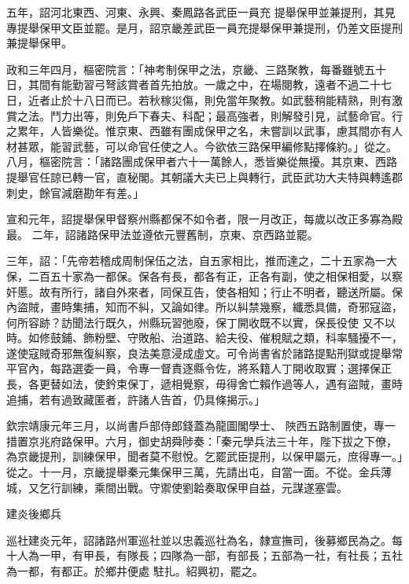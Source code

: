 \begin{pinyinscope}
 五年，詔河北東西、河東、永興、秦鳳路各武臣一員充
 提舉保甲並兼提刑，其見專提舉保甲文臣並罷。是月，詔京畿差武臣一員充提舉保甲兼提刑，仍差文臣提刑兼提舉保甲。



 政和三年四月，樞密院言：「神考制保甲之法，京畿、三路聚教，每番雖號五十日，其間有能勤習弓弩該賞者首先拍放。一歲之中，在場閱教，遠者不過二十七日，近者止於十八日而已。若秋稼災傷，則免當年聚教。如武藝稍能精熟，則有激賞之法。鬥力出等，則免戶下春夫、科配；最高強者，則解發引見，試藝命官。行
 之累年，人皆樂從。惟京東、西雖有團成保甲之名，未嘗訓以武事，慮其間亦有人材甚眾，能習武藝，可以命官任使之人。今欲依三路保甲編修點擇條約。」從之。八月，樞密院言：「諸路團成保甲者六十一萬餘人，悉皆樂從無擾。其京東、西路提舉官任諒已轉一官，直秘閣。其朝議大夫已上與轉行，武臣武功大夫特與轉遙郡刺史，餘官減磨勘年有差。」



 宣和元年，詔提舉保甲督察州縣都保不如令者，限一月改正，每歲以改正多寡為殿最。
 二年，詔諸路保甲法並遵依元豐舊制，京東、京西路並罷。



 三年，詔：「先帝若稽成周制保伍之法，自五家相比，推而達之，二十五家為一大保，二百五十家為一都保。保各有長，都各有正，正各有副，使之相保相愛，以察奸慝。故有所行，諸自外來者，同保互告，使各相知；行止不明者，聽送所屬。保內盜賊，畫時集捕，知而不糾，又論如律。所以糾禁幾察，纖悉具備，奇邪寇盜，何所容跡？訪聞法行既久，州縣玩習弛廢，保丁開收既不以實，保長役使
 又不以時。如修鼓鋪、飾粉壁、守敗船、治道路、給夫役、催稅賦之類，科率騷擾不一，遂使寇賊奇邪無復糾察，良法美意浸成虛文。可令尚書省於諸路提點刑獄或提舉常平官內，每路選委一員，令專一督責逐縣令佐，將系籍人丁開收取實；選擇保正長，各更替如法，使鈐束保丁，遞相覺察，毋得舍亡賴作過等人，遇有盜賊，畫時追捕，若有過致藏匿者，許諸人告首，仍具條揭示。」



 欽宗靖康元年三月，以尚書戶部侍郎錢蓋為龍圖閣學士、
 陜西五路制置使，專一措置京兆府路保甲。六月，御史胡舜陟奏：「秦元學兵法三十年，陛下拔之下僚，為京畿提刑，訓練保甲，聞者莫不慰悅。乞罷武臣提刑，以保甲屬元，庶得專一。」從之。十一月，京畿提舉秦元集保甲三萬，先請出屯，自當一面。不從。金兵薄城，又乞行訓練，乘間出戰。守禦使劉韐奏取保甲自益，元謀遂塞雲。



 建炎後鄉兵



 巡社建炎元年，詔諸路州軍巡社並以忠義巡社為名，隸宣撫司，後募鄉民為之。每十人為一甲，有甲長，有隊長；四隊為一部，有部長；五部為一社，有社長；五社為一都，有都正。於鄉井便處
 駐扎。紹興初，罷之。




\end{pinyinscope}
